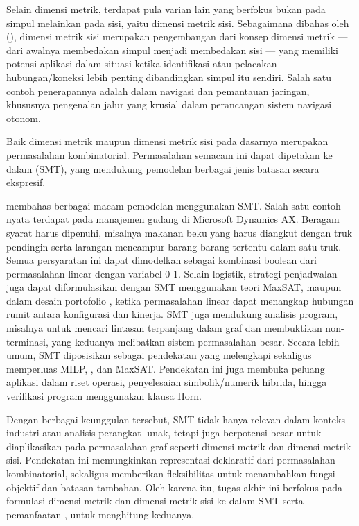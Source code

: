 Selain dimensi metrik, terdapat pula varian lain yang berfokus bukan pada simpul melainkan pada sisi, yaitu dimensi metrik sisi. Sebagaimana dibahas oleh \citeauthor{awadiyah2019} (\citeyear{awadiyah2019}), dimensi metrik sisi merupakan pengembangan dari konsep dimensi metrik --- dari awalnya membedakan simpul menjadi membedakan sisi --- yang memiliki potensi aplikasi dalam situasi ketika identifikasi atau pelacakan hubungan/koneksi lebih penting dibandingkan simpul itu sendiri. Salah satu contoh penerapannya adalah dalam navigasi dan pemantauan jaringan, khususnya pengenalan jalur yang krusial dalam perancangan sistem navigasi otonom.

Baik dimensi metrik maupun dimensi metrik sisi pada dasarnya merupakan permasalahan kombinatorial. Permasalahan semacam ini dapat dipetakan ke dalam  (SMT), yang mendukung pemodelan berbagai jenis batasan secara ekspresif.

\cite{smt-app} membahas berbagai macam pemodelan menggunakan SMT. Salah satu contoh nyata terdapat pada manajemen gudang di Microsoft Dynamics AX. Beragam syarat harus dipenuhi, misalnya makanan beku yang harus diangkut dengan truk pendingin serta larangan mencampur barang-barang tertentu dalam satu truk. Semua persyaratan ini dapat dimodelkan sebagai kombinasi boolean dari permasalahan linear dengan variabel 0-1. Selain logistik, strategi penjadwalan juga dapat diformulasikan dengan SMT menggunakan teori MaxSAT, maupun dalam desain portofolio , ketika permasalahan linear dapat menangkap hubungan rumit antara konfigurasi dan kinerja. SMT juga mendukung analisis program, misalnya untuk mencari lintasan terpanjang dalam graf dan membuktikan non-terminasi, yang keduanya melibatkan sistem permasalahan besar. Secara lebih umum, SMT diposisikan sebagai pendekatan yang melengkapi sekaligus memperluas MILP, , dan MaxSAT. Pendekatan ini juga membuka peluang aplikasi dalam riset operasi, penyelesaian simbolik/numerik hibrida, hingga verifikasi program menggunakan klausa Horn.

Dengan berbagai keunggulan tersebut, SMT tidak hanya relevan dalam konteks industri atau analisis perangkat lunak, tetapi juga berpotensi besar untuk diaplikasikan pada permasalahan graf seperti dimensi metrik dan dimensi metrik sisi. Pendekatan ini memungkinkan representasi deklaratif dari permasalahan kombinatorial, sekaligus memberikan fleksibilitas untuk menambahkan fungsi objektif dan batasan tambahan. Oleh karena itu, tugas akhir ini berfokus pada formulasi dimensi metrik dan dimensi metrik sisi ke dalam SMT serta pemanfaatan , untuk menghitung keduanya.

